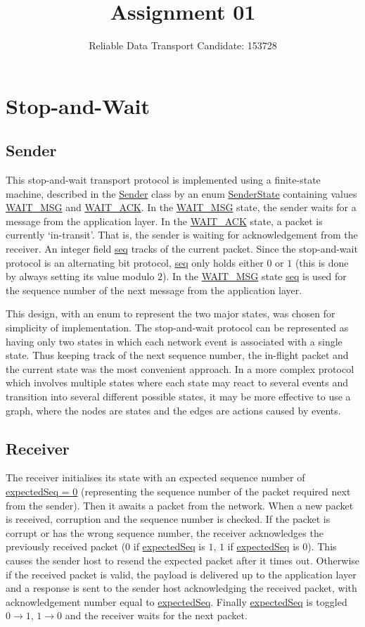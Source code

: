 \documentclass[a4paper]{article}
\title{\vspace{-5ex}Assignment 01}
\author{{Reliable Data Transport \hspace{1cm} Candidate: 153728}}
\date{}
\newcommand{\code}{\url}
\begin{document}
\maketitle
\vspace{-4ex}

\section{Stop-and-Wait}

\subsection{Sender}

This stop-and-wait transport protocol is implemented using a finite-state machine, described in the \code{Sender} class by an enum \code{SenderState} containing values \code{WAIT_MSG} and \code{WAIT_ACK}. In the \code{WAIT_MSG} state, the sender waits for a message from the application layer. In the \code{WAIT_ACK} state, a packet is currently `in-transit'. That is, the sender is waiting for acknowledgement from the receiver. An integer field \code{seq} tracks of the current packet. Since the stop-and-wait protocol is an alternating bit protocol, \code{seq} only holds either $0$ or $1$ (this is done by always setting its value modulo $2$). In the \code{WAIT_MSG} state \code{seq} is used for the sequence number of the next message from the application layer. 

This design, with an enum to represent the two major states, was chosen for simplicity of implementation. The stop-and-wait protocol can be represented as having only two states in which each network event is associated with a single state. Thus keeping track of the next sequence number, the in-flight packet and the current state was the most convenient approach. In a more complex protocol which involves multiple states where each state may react to several events and transition into several different possible states, it may be more effective to use a graph, where the nodes are states and the edges are actions caused by events.

\subsection{Receiver}

The receiver initialises its state with an expected sequence number of \code{expectedSeq = 0} (representing the sequence number of the packet required next from the sender). Then it awaits a packet from the network. When a new packet is received, corruption and the sequence number is checked. If the packet is corrupt or has the wrong sequence number, the receiver acknowledges the previously received packet ($0$ if \code{expectedSeq} is $1$, $1$ if \code{expectedSeq} is $0$). This causes the sender host to resend the expected packet after it times out. Otherwise if the received packet is valid, the payload is delivered up to the application layer and a response is sent to the sender host acknowledging the received packet, with acknowledgement number equal to \code{expectedSeq}. Finally \code{expectedSeq} is toggled $0 \rightarrow 1$, $1 \rightarrow 0$ and the receiver waits for the next packet.
\end{document}
